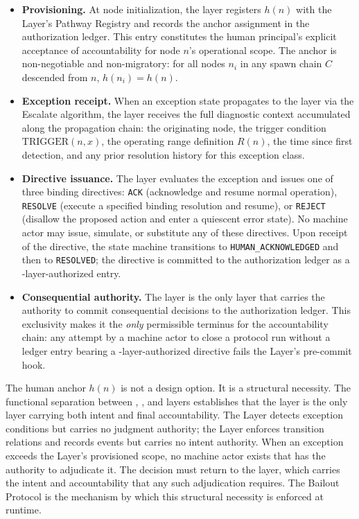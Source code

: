 \begin{itemize}\itemsep=0pt
\item[(\textit{i})] \textbf{Provisioning.}  At node initialization, the
\purpose{} layer registers $h(n)$ with the \fact{} Layer's Pathway Registry and
records the anchor assignment in the authorization ledger.  This entry
constitutes the human principal's explicit acceptance of accountability for node
$n$'s operational scope.  The anchor is non-negotiable and non-migratory: for
all nodes $n_i$ in any spawn chain $C$ descended from $n$, $h(n_i) = h(n)$.

\item[(\textit{ii})] \textbf{Exception receipt.}  When an exception state
propagates to the \purpose{} layer via the Escalate algorithm, the \purpose{}
layer receives the full diagnostic context accumulated along the propagation
chain: the originating node, the trigger condition $\text{TRIGGER}(n,x)$, the
operating range definition $R(n)$, the time since first detection, and any
prior resolution history for this exception class.

\item[(\textit{iii})] \textbf{Directive issuance.}  The \purpose{} layer
evaluates the exception and issues one of three binding directives:
\texttt{ACK} (acknowledge and resume normal operation), \texttt{RESOLVE}
(execute a specified binding resolution and resume), or \texttt{REJECT}
(disallow the proposed action and enter a quiescent error state).  No machine
actor may issue, simulate, or substitute any of these directives.  Upon
receipt of the directive, the state machine transitions to
\texttt{HUMAN\_ACKNOWLEDGED} and then to \texttt{RESOLVED}; the directive is
committed to the authorization ledger as a \purpose-layer-authorized entry.

\item[(\textit{iv})] \textbf{Consequential authority.}  The \purpose{} layer is
the only layer that carries the authority to commit consequential decisions to
the authorization ledger.  This exclusivity makes it the \emph{only} permissible
terminus for the accountability chain: any attempt by a machine actor to close a
protocol run without a ledger entry bearing a \purpose-layer-authorized
directive fails the \fact{} Layer's pre-commit hook.
\end{itemize}

The human anchor $h(n)$ is not a design option.  It is a structural necessity.
The functional separation between \purpose{}, \bounds{}, and \fact{} layers
establishes that the \purpose{} layer is the only layer carrying both intent and
final accountability.  The \bounds{} Layer detects exception conditions but
carries no judgment authority; the \fact{} Layer enforces transition relations
and records events but carries no intent authority.  When an exception exceeds the
\bounds{} Layer's provisioned scope, no machine actor exists that has the
authority to adjudicate it.  The decision must return to the \purpose{} layer,
which carries the intent and accountability that any such adjudication requires.
The Bailout Protocol is the mechanism by which this structural necessity is
enforced at runtime.

